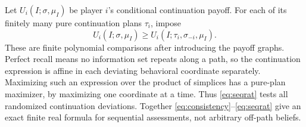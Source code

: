 \documentclass[11pt,a4paper]{article}
\numberwithin{equation}{section}
\theoremstyle{definition}
\begin{document}
Let \(U_i(I;\sigma,\mu_I)\) be player \(i\)'s conditional continuation
payoff. For each of its finitely many pure continuation plans \(\tau_i\),
impose
\begin{equation}\label{eq:seqrat}
U_i(I;\sigma,\mu_I)\ge
                 U_i(I;\tau_i,\sigma_{-i},\mu_I).
\end{equation}
These are finite polynomial comparisons after introducing the payoff
graphs. Perfect recall means no information set repeats along a path, so
the continuation expression is affine in each deviating behavioral
coordinate separately. Maximizing such an expression over the product
of simplices has a pure-plan maximizer, by maximizing one coordinate at
a time. Thus \eqref{eq:seqrat} tests all randomized continuation deviations.
Together \eqref{eq:consistency}--\eqref{eq:seqrat} give an exact finite real
formula for sequential assessments, not arbitrary off-path beliefs.
\end{document}
